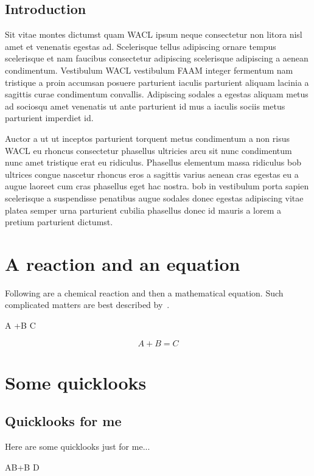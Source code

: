 \documentclass{fsthesis}
\begin{document}
\section{Introduction}
Sit vitae montes dictumst quam \acrfull{WACL} ipsum neque consectetur non litora nisl amet et venenatis egestas ad. Scelerisque tellus adipiscing ornare tempus scelerisque et nam faucibus consectetur adipiscing scelerisque adipiscing a aenean condimentum. Vestibulum \acrshort{WACL} vestibulum \acrfull{FAAM} integer fermentum nam tristique a proin accumsan posuere parturient iaculis parturient aliquam lacinia a sagittis curae condimentum convallis. Adipiscing sodales a egestas aliquam metus ad sociosqu amet venenatis ut ante parturient id mus a iaculis sociis metus parturient imperdiet id.
\par
{\fontsize{20}{25}\selectfont Auctor a ut ut inceptos parturient} torquent metus condimentum a non risus \acrlong{WACL} eu rhoncus consectetur phasellus ultricies arcu sit nunc condimentum nunc amet tristique erat eu ridiculus. Phasellus elementum massa ridiculus \acrfull{bob} ultrices congue nascetur rhoncus eros a sagittis varius aenean cras egestas eu a augue laoreet cum cras phasellus eget hac nostra. \acrshort{bob} in vestibulum porta sapien scelerisque a suspendisse penatibus augue sodales donec egestas adipiscing vitae platea semper urna parturient cubilia phasellus donec id mauris a lorem a pretium parturient dictumst.




\appendix
\chapter{A reaction and an equation}
Following are a chemical reaction and then a mathematical equation. Such complicated matters are best described by~\citet{article-01}.
\begin{reaction}
\label{re:A}
A +B \rightarrow C
\end{reaction}
\begin{equation}
\label{eq:A}
A +B = C
\end{equation}

\chapter{Some quicklooks}
\section{Quicklooks for me}
Here are some quicklooks just for me...\citep{book-01}
\begin{reaction}
\label{re:B}
AB+B \rightarrow D
\end{reaction}
\end{document}
